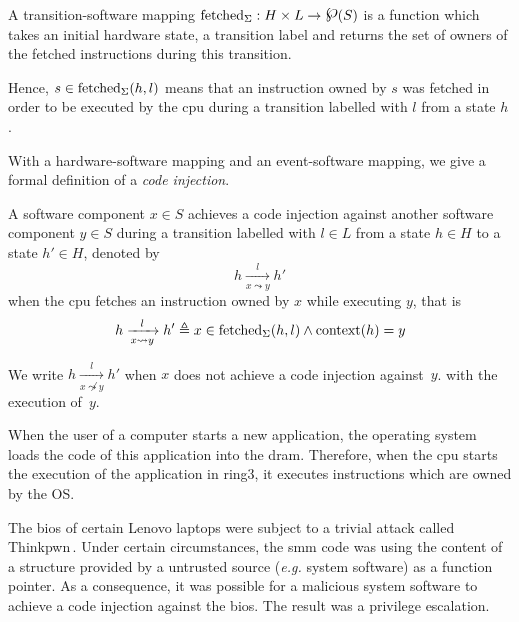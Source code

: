 \begin{definition}
  \label{def:speccert2:transsoft}
  A transition-software mapping
  $\func{fetched}_{\Sigma}: H \times L \rightarrow \powerset(S)$ is a function
  which takes an initial hardware state, a transition label and returns the set
  of owners of the fetched instructions during this transition.
\end{definition}

Hence, $s \in \mathrm{fetched}_{\Sigma}(h, l)$ means that an instruction owned by
$s$ was fetched in order to be executed by the \ac{cpu} during a transition
labelled with $l$ from a state $h$.

With a hardware-software mapping and an event-software mapping, we give a formal
definition of a \textit{code injection}.

\begin{definition}
  \label{def:speccert:tempering}
  A software component $x \in S$ achieves a code injection against another
  software component $y \in S$ during a transition labelled with $l \in L$ from
  a state $h \in H$ to a state $h' \in H$, denoted by
  \[
    h \xrightarrow[x \leadsto y]{l} h'
  \]
  when the \ac{cpu} fetches an instruction owned by $x$ while executing $y$,
  that is
  \[
    h \xrightarrow[x \leadsto y]{l} h' \triangleq x \in
    \mathrm{fetched}_{\Sigma}(h, l) \wedge \mathrm{context}(h) = y
  \]

  We write $h \xrightarrow[x \not\leadsto y]{l} h'$ when $x$ does not achieve a
  code injection against~$y$.  with the execution of~$y$.
\end{definition}

\begin{example}
  When the user of a computer starts a new application, the operating system
  loads the code of this application into the \ac{dram}. Therefore, when the
  \ac{cpu} starts the execution of the application in ring3, it executes
  instructions which are owned by the OS.
\end{example}

\begin{example}
  The \ac{bios} of certain Lenovo laptops were subject to a trivial attack
  called Thinkpwn\,\cite{cr4sh2016thinkpwn}.
  Under certain circumstances, the \ac{smm} code was using the content of a
  structure provided by a untrusted source (\emph{e.g.} system software) as a
  function pointer.
  As a consequence, it was possible for a malicious system software to achieve a
  code injection against the \ac{bios}.
  The result was a privilege escalation.
\end{example}

